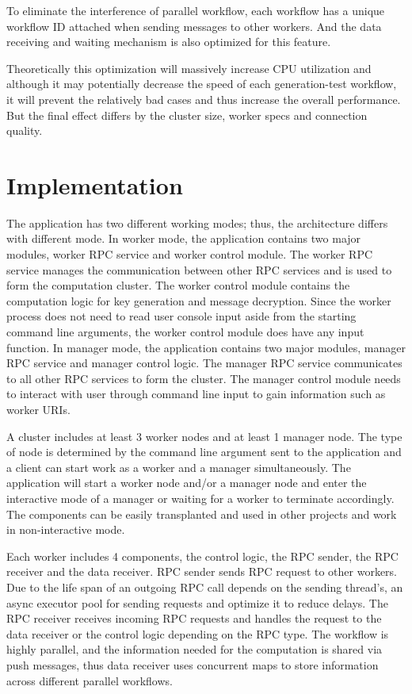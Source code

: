 To eliminate the interference of parallel workflow, each workflow has a unique workflow ID attached when sending messages to other workers. And the data receiving and waiting mechanism is also optimized for this feature.

Theoretically this optimization will massively increase CPU utilization and although it may potentially decrease the speed of each generation-test workflow, it will prevent the relatively bad cases and thus increase the overall performance. But the final effect differs by the cluster size, worker specs and connection quality.

\section{Implementation}

The application has two different working modes; thus, the architecture differs with different mode. In worker mode, the application contains two major modules, worker RPC service and worker control module. The worker RPC service manages the communication between other RPC services and is used to form the computation cluster. The worker control module contains the computation logic for key generation and message decryption. Since the worker process does not need to read user console input aside from the starting command line arguments, the worker control module does have any input function. In manager mode, the application contains two major modules, manager RPC service and manager control logic. The manager RPC service communicates to all other RPC services to form the cluster. The manager control module needs to interact with user through command line input to gain information such as worker  URIs.

A cluster includes at least 3 worker nodes and at least 1 manager node. The type of node is determined by the command line argument sent to the application and a client can start work as a worker and a manager simultaneously. The application will start a worker node and/or a manager node and enter the interactive mode of a manager or waiting for a worker to terminate accordingly. The components can be easily transplanted and used in other projects and work in non-interactive mode.

Each worker includes 4 components, the control logic, the RPC sender, the RPC receiver and the data receiver. RPC sender sends RPC request to other workers. Due to the life span of an outgoing RPC call depends on the sending thread’s, an async executor pool for sending requests and optimize it to reduce delays. The RPC receiver receives incoming RPC requests and handles the request to the data receiver or the control logic depending on the RPC type. The workflow is highly parallel, and the information needed for the computation is shared via push messages, thus data receiver uses concurrent maps to store information across different parallel workflows.

